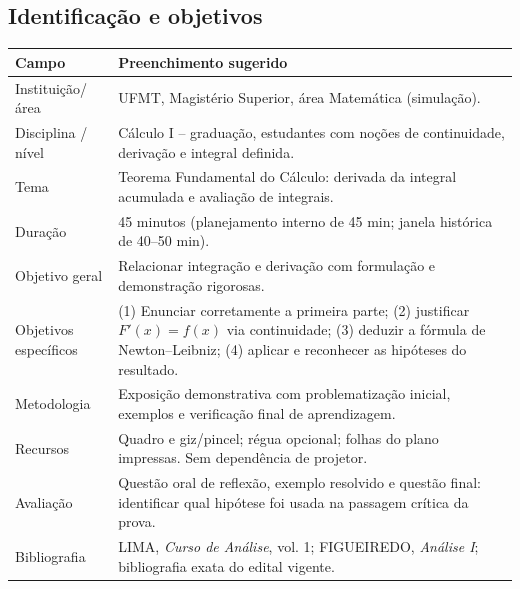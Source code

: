 \documentclass[11pt,a4paper]{article}
\begin{document}
\subsection{Identificação e objetivos}
\begin{tabularx}{\textwidth}{p{}X}
\toprule
\textbf{Campo} & \textbf{Preenchimento sugerido}\\\midrule
Instituição/área & UFMT, Magistério Superior, área Matemática (simulação).\\
Disciplina / nível & Cálculo I -- graduação, estudantes com noções de continuidade, derivação e integral definida.\\
Tema & Teorema Fundamental do Cálculo: derivada da integral acumulada e avaliação de integrais.\\
Duração & 45 minutos (planejamento interno de 45 min; janela histórica de 40--50 min).\\
Objetivo geral & Relacionar integração e derivação com formulação e demonstração rigorosas.\\
Objetivos específicos & (1) Enunciar corretamente a primeira parte; (2) justificar $F'(x)=f(x)$ via continuidade; (3) deduzir a fórmula de Newton--Leibniz; (4) aplicar e reconhecer as hipóteses do resultado.\\
Metodologia & Exposição demonstrativa com problematização inicial, exemplos e verificação final de aprendizagem.\\
Recursos & Quadro e giz/pincel; régua opcional; folhas do plano impressas. Sem dependência de projetor.\\
Avaliação & Questão oral de reflexão, exemplo resolvido e questão final: identificar qual hipótese foi usada na passagem crítica da prova.\\
Bibliografia & LIMA, \emph{Curso de Análise}, vol. 1; FIGUEIREDO, \emph{Análise I}; bibliografia exata do edital vigente.\\\bottomrule
\end{tabularx}
\end{document}
